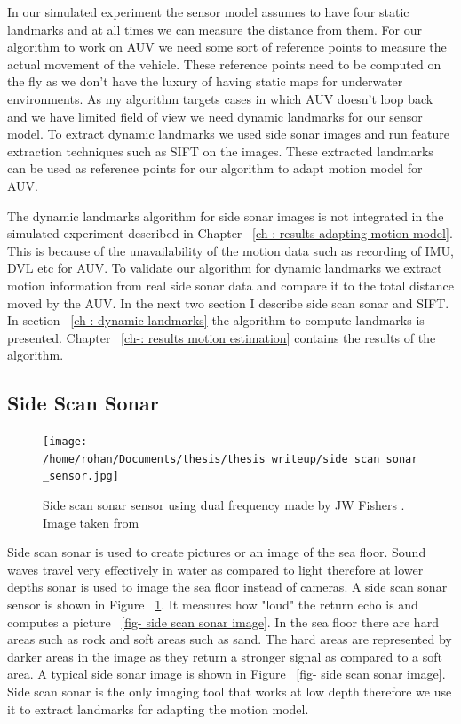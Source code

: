 \documentclass[12pt]{dalcsthesis}
\begin{document}
In our simulated experiment the sensor model assumes to have four static landmarks and at all times we can measure the distance from them. For our algorithm to work on AUV we need some sort of reference points to measure the actual movement of the vehicle. These reference points need to be computed on the fly as we don't have the luxury of having static maps for underwater environments. As my algorithm targets cases in which AUV doesn't loop back and we have limited field of view we need dynamic landmarks for our sensor model. To extract dynamic landmarks we used side sonar images and run feature extraction techniques such as SIFT on the images. These extracted landmarks can be used as reference points for our algorithm to adapt motion model for AUV.

The dynamic landmarks algorithm for side sonar images is not integrated in the simulated experiment described in Chapter ~\ref{ch-: results adapting motion model}. This is because of the unavailability of the motion data such as recording of IMU, DVL etc for AUV. To validate our algorithm for dynamic landmarks we extract motion information from real side sonar data and compare it to the total distance moved by the AUV. In the next two section I describe side scan sonar and SIFT. In section ~\ref{ch-: dynamic landmarks} the algorithm to compute landmarks is presented. Chapter ~\ref{ch-: results motion estimation} contains the results of the algorithm.  



\subsection{Side Scan Sonar} 
\begin{figure}[!ht]
  \centering
     {\texttt{[image: /home/rohan/Documents/thesis/thesis\_writeup/side\_scan\_sonar\_sensor.jpg]}}
  \caption{\label{fig- side scan sonar sensor} Side scan sonar sensor using dual frequency made by JW Fishers . Image taken from \cite{side_sonar_fisheries_url}}
\end{figure}
Side scan sonar is used to create pictures or an image of the sea floor. Sound waves travel very effectively in water as compared to light therefore at lower depths sonar is used to image the sea floor instead of cameras. A side scan sonar sensor is shown in Figure ~\ref{fig- side scan sonar sensor}. It measures how "loud" the return echo is and computes a picture ~\ref{fig- side scan sonar image}. In the sea floor there are hard areas such as rock and soft areas such as sand. The hard areas are represented by darker areas in the image as they return a stronger signal as compared to a soft area. A typical side sonar image is shown in Figure ~\ref{fig- side scan sonar image}. Side scan sonar is the only imaging tool that works at low depth therefore we use it to extract landmarks for adapting the motion model. 
\end{document}

